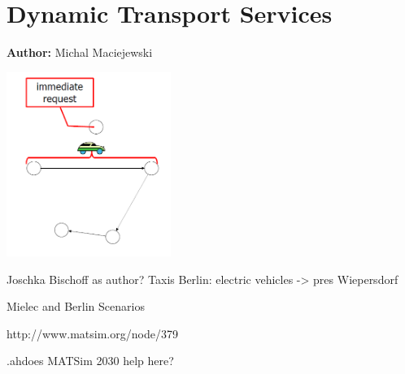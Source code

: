 \chapter{Dynamic Transport Services }
\label{ch:dts}

\hfill \textbf{Author:} Michal Maciejewski

\begin{center} \includegraphics[width=0.4\textwidth, angle=0]{extending/figures/DTS/dts.png} \end{center}

Joschka Bischoff as author?
Taxis Berlin: electric vehicles -> pres Wiepersdorf

Mielec and Berlin Scenarios

http://www.matsim.org/node/379

\kwa.ah{does MATSim 2030 help here?}

